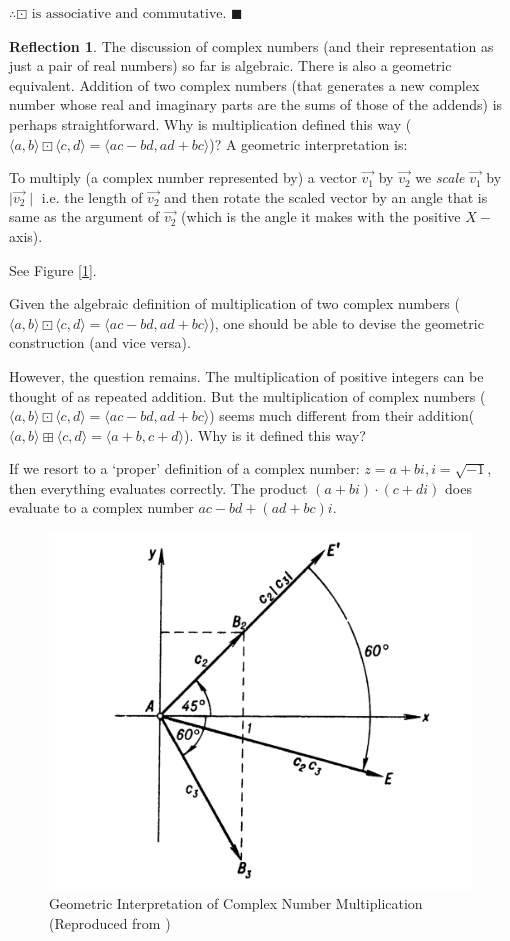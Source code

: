 \documentclass[english,notitlepage,smartquotes]{hgbreport}
\theoremstyle{definition}
\theoremstyle{definition}
\theoremstyle{remark}
\theoremstyle{plain}
\theoremstyle{definition}
\renewcommand\qedsymbol{$\blacksquare$}
\theoremstyle{definition}
\newtheorem{reflection}{Reflection}
\begin{document}
$\therefore \boxdot \text{ is associative and commutative}$. 
\qedsymbol
\begin{reflection}
The discussion of complex numbers (and their representation as just a pair of real numbers) so far is algebraic. There is also a geometric equivalent. Addition of two complex numbers (that generates a new complex number whose real and imaginary parts are the sums of those of the addends) is perhaps straightforward. Why is multiplication defined this way ($\langle a,b\rangle\boxdot\langle c,d\rangle=\langle ac-bd,ad+bc\rangle$)? A geometric interpretation is:
\begin{sidebar}
To multiply (a complex number represented by) a vector $\vec{v_1}$ by $\vec{v_2}$ we \textit{scale} $\vec{v_1}$ by $\mid \vec{v_2}\mid$ i.e. the length of $\vec{v_2}$ and then rotate the scaled vector by an angle that is same as the argument of $\vec{v_2}$ (which is the angle it makes with the positive $X-$axis).

See Figure [\ref{fig:complexmult}].
\end{sidebar} 
Given the algebraic definition of multiplication of two complex numbers ($\langle a,b\rangle\boxdot\langle c,d\rangle=    \langle ac-bd,ad+bc\rangle$), one should be able to devise the geometric construction (and vice versa).

However, the question remains. The multiplication of positive integers can be thought of as repeated addition. But the multiplication of complex numbers ($\langle a,b\rangle\boxdot\langle c,d\rangle=    \langle ac-bd,ad+bc\rangle$) seems much different from their addition($\langle a,b\rangle\boxplus\langle c,d\rangle=\langle a+b,c+d\rangle$). Why is it defined this way?

If we resort to a `proper' definition of a complex number: $z=a+bi, i=\sqrt{-1}$, then everything evaluates correctly. The product $(a+bi)\cdot(c+di)$ does evaluate to a complex number $ac-bd+(ad+bc)i$.
\end{reflection}
\begin{figure}[h]
\begin{center}
\caption{Geometric Interpretation of Complex Number Multiplication (Reproduced from \cite{AleksanovaMarkushevich1982})}
\label{fig:complexmult}
\includegraphics[width=.3\textwidth]{c1xc2} 
\end{center}
\end{figure}
\end{document}
